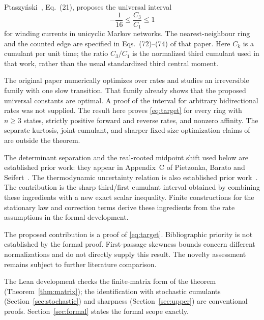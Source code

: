 \documentclass[11pt,a4paper]{article}
\numberwithin{equation}{section}
\theoremstyle{remark}
\begin{document}
Ptaszy\'nski~\cite{Ptaszynski2022}, Eq.~(21), proposes the universal interval
\begin{equation}\label{eq:target}
  -\frac1{16}\le \frac{C_3}{C_1}\le1
\end{equation}
for winding currents in unicyclic Markov networks. The nearest-neighbour
ring and the counted edge are specified in Eqs.~(72)--(74) of that paper.
Here $C_k$ is a cumulant per unit time; the ratio $C_3/C_1$ is the normalized
third cumulant used in that work, rather than the usual standardized third
central moment.

The original paper numerically optimizes over rates and studies an
irreversible family with one slow transition. That family already shows
that the proposed universal constants are optimal. A proof of the interval
for arbitrary bidirectional rates was not supplied. The result here proves
\eqref{eq:target} for every ring with $n\ge3$ states, strictly positive
forward and reverse rates, and nonzero affinity. The separate kurtosis,
joint-cumulant, and sharper fixed-size optimization claims of
\cite{Ptaszynski2022} are outside the theorem.

The determinant separation and the real-rooted midpoint shift used below
are established prior work: they appear in Appendix~C of Pietzonka, Barato
and Seifert~\cite{Pietzonka2016}. The thermodynamic uncertainty relation is
also established prior work~\cite{Gingrich2016}. The contribution is the
sharp third/first cumulant interval obtained by combining these ingredients
with a new exact scalar inequality. Finite constructions for the stationary law and correction terms derive
these ingredients from the rate assumptions in the formal development.

The proposed contribution is a proof of \eqref{eq:target}. Bibliographic
priority is not established by the formal proof. First-passage skewness bounds
\cite{Barato2015,Wampler2022} concern different normalizations and do not
directly supply this result. The novelty assessment remains subject to further literature comparison.

The Lean development checks the finite-matrix form of the theorem
(Theorem~\ref{thm:matrix}); the identification with stochastic cumulants
(Section~\ref{sec:stochastic}) and sharpness (Section~\ref{sec:upper}) are
conventional proofs. Section~\ref{sec:formal} states the formal scope
exactly.
\end{document}
